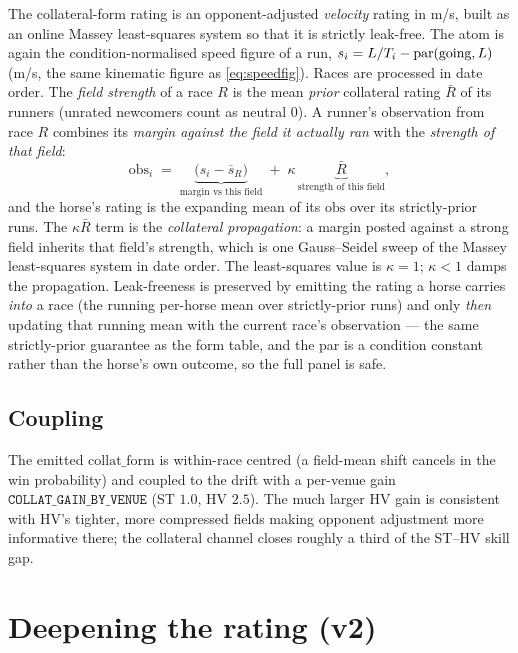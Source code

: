 The collateral-form rating is an opponent-adjusted \emph{velocity} rating in m/s, built as an
online Massey least-squares system so that it is strictly leak-free. The atom is again the
condition-normalised speed figure of a run, $s_i = L/T_i - \mathrm{par}(\text{going},L)$ (m/s,
the same kinematic figure as \eqref{eq:speedfig}). Races are processed in date order. The
\emph{field strength} of a race $R$ is the mean \emph{prior} collateral rating $\bar R$ of its
runners (unrated newcomers count as neutral $0$). A runner's observation from race $R$ combines its
\emph{margin against the field it actually ran} with the \emph{strength of that field}:
\begin{equation}
  \mathrm{obs}_i \;=\; \underbrace{\bigl(s_i - \overline{s}_R\bigr)}_{\text{margin vs this field}}
   \;+\; \kappa\,\underbrace{\bar R}_{\text{strength of this field}},
  \label{eq:collat-obs}
\end{equation}
and the horse's rating is the expanding mean of its $\mathrm{obs}$ over its strictly-prior runs.
The $\kappa\bar R$ term is the \emph{collateral propagation}: a margin posted against a strong
field inherits that field's strength, which is one Gauss--Seidel sweep of the Massey
least-squares system in date order. The least-squares value is $\kappa=1$; $\kappa<1$ damps the
propagation. Leak-freeness is preserved by emitting the rating a horse carries \emph{into} a race
(the running per-horse mean over strictly-prior runs) and only \emph{then} updating that running
mean with the current race's observation --- the same strictly-prior guarantee as the form table,
and the par is a condition constant rather than the horse's own outcome, so the full panel is safe.

\subsection{Coupling}

The emitted $\mathrm{collat\_form}$ is within-race centred (a field-mean shift cancels in the win
probability) and coupled to the drift with a per-venue gain $\texttt{COLLAT\_GAIN\_BY\_VENUE}$ (ST
$1.0$, HV $2.5$). The much larger HV gain is consistent with HV's tighter, more compressed fields
making opponent adjustment more informative there; the collateral channel closes roughly a third
of the ST--HV skill gap.

\section{Deepening the rating (v2)}

